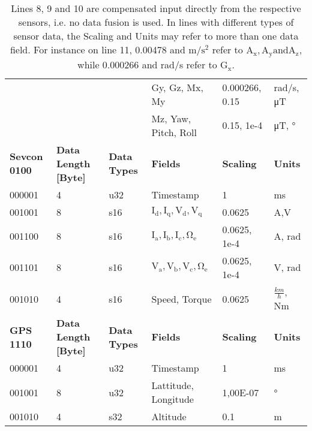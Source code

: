 \begin{landscape}
\begin{table}[H]
\begin{tabular}{@{\makebox[3em][r]{\rownumber\space}}|llllll}
&                      &                     & Gy, Gz, Mx, My              & 0.000266, 0.15     & rad/s, \si{\micro \tesla}                       \\
&                      &                     & Mz, Yaw, Pitch, Roll        & 0.15, 1e-4         & \si{\micro \tesla}, \si{\degree}                    \\
\hline
 \textbf{Sevcon 0100} & \textbf{Data Length [Byte]} & \textbf{Data Types} & \textbf{Fields}             & \textbf{Scaling}   & \textbf{Units}                                    \\
\hline
000001               & 4                    & u32                 & Timestamp                   & 1                  & ms                                                \\
001001               & 8                    & s16                 & $\mathrm{I_d,I_q,V_d,V_q}$                & 0.0625             & A,V                                               \\
001100               & 8                    & s16                 & $\mathrm{I_a, I_b, I_c, \Omega_e}$ & 0.0625, 1e-4       & A, rad                                            \\
001101               & 8                    & s16                 & $\mathrm{V_a, V_b, V_c, \Omega_e}$ & 0.0625, 1e-4       & V, rad                                            \\
001010               & 4                    & s16                 & Speed, Torque               & 0.0625             & $\frac{km}{h}$, Nm                              \\
\hline
\textbf{GPS 1110}    & \textbf{Data Length [Byte]} & \textbf{Data Types} & \textbf{Fields}             & \textbf{Scaling}   & \textbf{Units}                                    \\
\hline
000001               & 4                    & u32                 & Timestamp                   & 1                  & ms                                                \\
001001               & 8                    & u32                 & Lattitude, Longitude        & 1,00E-07           & \si{\degree} \\
001010               & 4                    & s32                 & Altitude                    & 0.1                & m                                                
      
	\end{tabular}
	\caption{Lines 8, 9 and 10 are compensated input directly from the respective sensors, i.e. no data fusion is used. 
	In lines with different types of sensor data, the Scaling and Units may refer to more than one data field.
	For instance on line 11, 0.00478 and $\si{\meter \per \second \squared}$ refer to $\mathrm{A_x, A_y and A_z}$, while 0.000266 and rad/s refer to $\mathrm{G_x}$.}
	\label{tab:OD}
\end{table}


\end{landscape}
